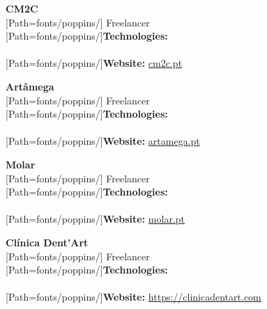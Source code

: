 \begin{minipage}{.5\textwidth}
\textbf{CM2C}\\[3pt]
{
	\scriptsize
	[Path=fonts/poppins/]
	Freelancer\\[2pt]

	{[Path=fonts/poppins/]\textbf{Technologies:}}\\
	 \\[2pt]

	{[Path=fonts/poppins/]\textbf{Website:}} \href{https://cm2c.pt}{cm2c.pt}
}
\end{minipage}
\begin{minipage}{.5\textwidth}
	\textbf{Artâmega}\\[3pt]
	{
		\scriptsize
		[Path=fonts/poppins/]
		Freelancer\\[2pt]

		{[Path=fonts/poppins/]\textbf{Technologies:}}\\
		 \\[2pt]

		{[Path=fonts/poppins/]\textbf{Website:}} \href{https://artamega.pt/}{artamega.pt}
	}
\end{minipage}

\vspace{10pt}

\begin{minipage}{.5\textwidth}
\textbf{Molar}\\[3pt]
{
	\scriptsize
	[Path=fonts/poppins/]
	Freelancer\\[2pt]

	{[Path=fonts/poppins/]\textbf{Technologies:}}\\
	 \\[2pt]

	{[Path=fonts/poppins/]\textbf{Website:}} \href{https://molar.pt}{molar.pt}
}
\end{minipage}
\begin{minipage}{.5\textwidth}
	\textbf{Clínica Dent'Art}\\[3pt]
	{
		\scriptsize
		[Path=fonts/poppins/]
		Freelancer\\[2pt]

		{[Path=fonts/poppins/]\textbf{Technologies:}}\\
		 \\[2pt]

		{[Path=fonts/poppins/]\textbf{Website:}} \href{https://clinicadentart.com}{https://clinicadentart.com}
	}
\end{minipage}